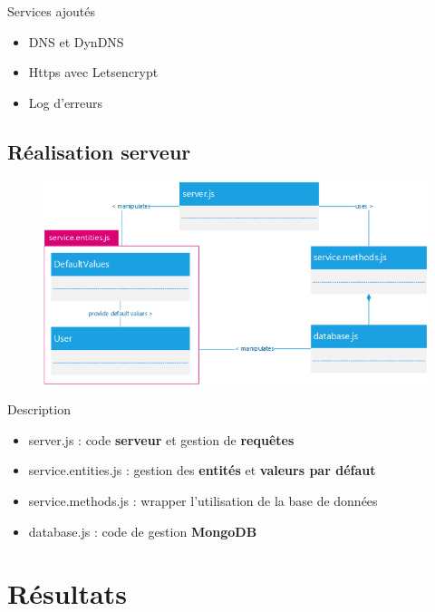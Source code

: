 \documentclass{beamer} %
\begin{document}
\begin{frame}{\subsecname}
    \begin{exampleblock}{Services ajoutés}
      \begin{itemize}
        \item DNS et DynDNS
        \item Https avec Letsencrypt
        \item Log d'erreurs
      \end{itemize}
    \end{exampleblock}

  \end{frame}

  \subsection{Réalisation serveur}
  \begin{frame}{\subsecname}
    \vspace*{-2mm}
    \begin{figure}
      \includegraphics[width=0.8\linewidth, height=\textheight, keepaspectratio]{architecture-service-web-simple.png}
    \end{figure}
    \begin{block}{Description}
      \begin{itemize}
        \item server.js : code \textbf{serveur} et gestion de \textbf{requêtes}
        \item service.entities.js : gestion des \textbf{entités} et \textbf{valeurs par défaut}
        \item service.methods.js : wrapper l'utilisation de la base de données
        \item database.js : code de gestion \textbf{MongoDB}
      \end{itemize}
    \end{block}
  \end{frame}

  \section{Résultats}
\end{document}
